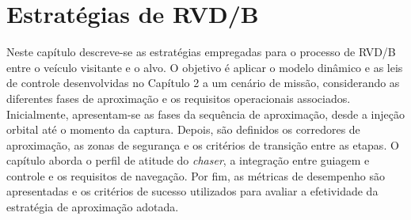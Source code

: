 \chapter{Estratégias de RVD/B}
\label{sec:Estrategias_RVDB}

Neste capítulo descreve-se as estratégias empregadas para o processo de RVD/B entre o veículo visitante e o alvo. O objetivo é aplicar o modelo dinâmico e as leis de controle desenvolvidas no Capítulo 2 a um cenário de missão, considerando as diferentes fases de aproximação e os requisitos operacionais associados.
Inicialmente, apresentam-se as fases da sequência de aproximação, desde a injeção orbital até o momento da captura. Depois, são definidos os corredores de aproximação, as zonas de segurança e os critérios de transição entre as etapas.
O capítulo aborda o perfil de atitude do \textit{chaser}, a integração entre guiagem e controle e os requisitos de navegação.
Por fim, as métricas de desempenho são apresentadas e os critérios de sucesso utilizados para avaliar a efetividade da estratégia de aproximação adotada.

% 
% 
% 
% 
% 
% 
% 
